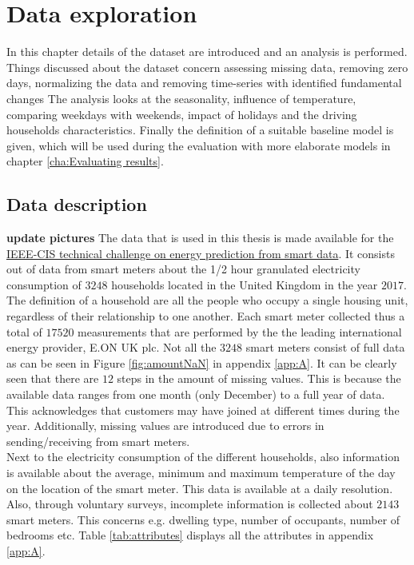 \chapter{Data exploration}
\label{cha:Data analysis}
In this chapter details of the dataset are introduced and an analysis is performed. Things discussed about the dataset concern assessing missing data, removing zero days, normalizing the data and removing time-series with identified fundamental changes The analysis looks at the seasonality,  influence of temperature, comparing weekdays with weekends, impact of holidays and the driving households characteristics. Finally the definition of a suitable baseline model is given, which will be used during the evaluation with more elaborate models in chapter \ref{cha:Evaluating results}.


\section{Data description}
\textbf{update pictures}
The data that is used in this thesis is made available for the \href{https://ieee-dataport.org/competitions/ieee-cis-technical-challenge-energy-prediction-smart-meter-data}{IEEE-CIS technical challenge on energy prediction from smart data}. It consists out of data from smart meters about the 1/2 hour granulated electricity consumption of $3248$ households located in the United Kingdom in the year $2017$. The definition of a household are all the people who occupy a single housing unit, regardless of their relationship to one another. Each smart meter collected thus a total of $17520$ measurements that are performed by the the leading international energy provider, E.ON UK plc. Not all the $3248$ smart meters consist of full data as can be seen in Figure \ref{fig:amountNaN} in appendix \ref{app:A}. It can be clearly seen that there are $12$ steps in the amount of missing values. This is because the available data ranges from one month (only December) to a full year of data. This acknowledges that customers may have joined at different times during the year. Additionally, missing values are introduced due to errors in sending/receiving from smart meters.\\
Next to the electricity consumption of the different households, also information is available about the average, minimum and maximum temperature of the day on the location of the smart meter. This data is available at a daily resolution. Also, through voluntary surveys, incomplete information is collected about $2143$ smart meters. This concerns e.g. dwelling type, number of occupants, number of bedrooms etc. Table \ref{tab:attributes} displays all the attributes in appendix \ref{app:A}.\\

